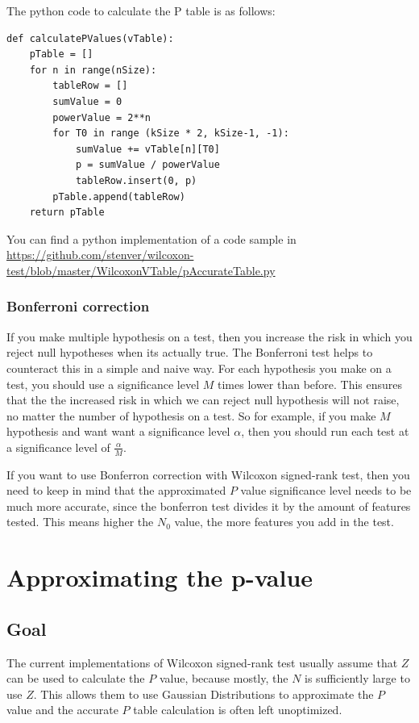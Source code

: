 \documentclass[12pt]{article}
\begin{document}
The python code to calculate the P table is as follows:

\begin{verbatim}
def calculatePValues(vTable):
    pTable = []
    for n in range(nSize):
        tableRow = []
        sumValue = 0
        powerValue = 2**n
        for T0 in range (kSize * 2, kSize-1, -1):
            sumValue += vTable[n][T0]
            p = sumValue / powerValue
            tableRow.insert(0, p)
        pTable.append(tableRow)
    return pTable

\end{verbatim}

You can find a python implementation of a code sample in
\url{https://github.com/stenver/wilcoxon-test/blob/master/WilcoxonVTable/pAccurateTable.py}

\subsubsection{Bonferroni correction}

If you make multiple hypothesis on a test, then you increase the risk in which you reject null hypotheses when its actually true. The Bonferroni test helps to counteract this in a simple and naive way. For each hypothesis you make on a test, you should use a significance level $M$ times lower than before. This ensures that the the increased risk in which we can reject null hypothesis will not raise, no matter the number of hypothesis on a test. So for example, if you make $M$ hypothesis and want want a significance level $\alpha$,  then you should run each test at a significance level of $\frac{\alpha}{M}$.

If you want to use Bonferron correction with Wilcoxon signed-rank test, then you need to keep in mind that the approximated $P$ value significance level needs to be much more accurate, since the bonferron test divides it by the amount of features tested. This means higher the $N_0$ value, the more features you add in the test.

\newpage

\section{Approximating the p-value}

\subsection{Goal}
The current implementations of Wilcoxon signed-rank test usually assume that $Z$ can be used to calculate the $P$ value, because mostly, the $N$ is sufficiently large to use $Z$.
This allows them to use Gaussian Distributions to approximate the $P$ value and the accurate $P$ table calculation is often left unoptimized.
\end{document}
